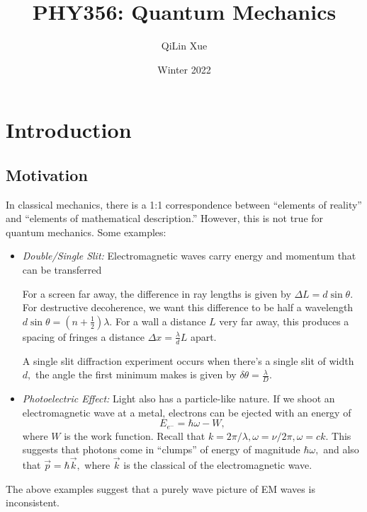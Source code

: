 \documentclass{article}
\title{PHY356: Quantum Mechanics}
\author{QiLin Xue}
\date{Winter 2022}
\numberwithin{equation}{section}
\begin{document}
\maketitle
\tableofcontents
\section{Introduction}
\subsection{Motivation}
In classical mechanics, there is a 1:1 correspondence between ``elements of reality'' and ``elements of mathematical description.'' However, this is not true for quantum mechanics. Some examples:
\begin{itemize}
    \item \textit{Double/Single Slit:} Electromagnetic waves carry energy and momentum that can be transferred 
    \begin{center}
    \end{center}
    For a screen far away, the difference in ray lengths is given by $\Delta L = d\sin\theta.$ For destructive decoherence, we want this difference to be half a wavelength $d\sin\theta = \left(n+\frac{1}{2}\right)\lambda.$ For a wall a distance $L$ very far away, this produces a spacing of fringes a distance $\Delta x = \frac{\lambda}{d}{L}$ apart.

    A single slit diffraction experiment occurs when there's a single slit of width $d,$ the angle the first minimum makes is given by $\delta \theta = \frac{\lambda}{D}.$
    \item \textit{Photoelectric Effect:} Light also has a particle-like nature. If we shoot an electromagnetic wave at a metal, electrons can be ejected with an energy of
    \begin{equation*}
        E_{e^-} = \hbar\omega - W,
    \end{equation*}
    where $W$ is the work function. Recall that $k=2\pi/\lambda,\omega=\nu/2\pi, \omega=ck.$ This suggests that photons come in ``clumps'' of energy of magnitude $\hbar\omega,$ and also that $\vec{p}=\hbar\vec{k},$ where $\vec{k}$ is the classical  of the electromagnetic wave.
\end{itemize}
The above examples suggest that a purely wave picture of EM waves is inconsistent.
\end{document}
